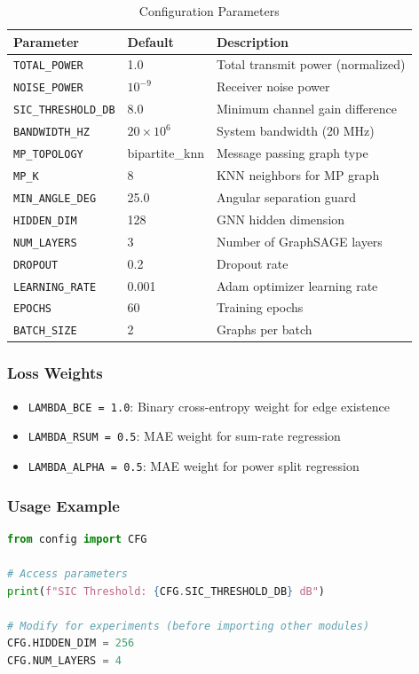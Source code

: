 \documentclass[12pt,a4paper]{article}
\begin{document}
\begin{table}[H]
\centering
\begin{tabular}{@{}lll@{}}
\toprule
\textbf{Parameter} & \textbf{Default} & \textbf{Description} \\
\midrule
\texttt{TOTAL\_POWER} & 1.0 & Total transmit power (normalized) \\
\texttt{NOISE\_POWER} & $10^{-9}$ & Receiver noise power \\
\texttt{SIC\_THRESHOLD\_DB} & 8.0 & Minimum channel gain difference \\
\texttt{BANDWIDTH\_HZ} & $20 \times 10^6$ & System bandwidth (20 MHz) \\
\texttt{MP\_TOPOLOGY} & bipartite\_knn & Message passing graph type \\
\texttt{MP\_K} & 8 & KNN neighbors for MP graph \\
\texttt{MIN\_ANGLE\_DEG} & 25.0 & Angular separation guard \\
\texttt{HIDDEN\_DIM} & 128 & GNN hidden dimension \\
\texttt{NUM\_LAYERS} & 3 & Number of GraphSAGE layers \\
\texttt{DROPOUT} & 0.2 & Dropout rate \\
\texttt{LEARNING\_RATE} & 0.001 & Adam optimizer learning rate \\
\texttt{EPOCHS} & 60 & Training epochs \\
\texttt{BATCH\_SIZE} & 2 & Graphs per batch \\
\bottomrule
\end{tabular}
\caption{Configuration Parameters}
\end{table}

\subsubsection{Loss Weights}
\begin{itemize}
    \item \texttt{LAMBDA\_BCE = 1.0}: Binary cross-entropy weight for edge existence
    \item \texttt{LAMBDA\_RSUM = 0.5}: MAE weight for sum-rate regression
    \item \texttt{LAMBDA\_ALPHA = 0.5}: MAE weight for power split regression
\end{itemize}

\subsubsection{Usage Example}
\begin{lstlisting}[language=Python]
from config import CFG

# Access parameters
print(f"SIC Threshold: {CFG.SIC_THRESHOLD_DB} dB")

# Modify for experiments (before importing other modules)
CFG.HIDDEN_DIM = 256
CFG.NUM_LAYERS = 4
\end{lstlisting}
\end{document}
